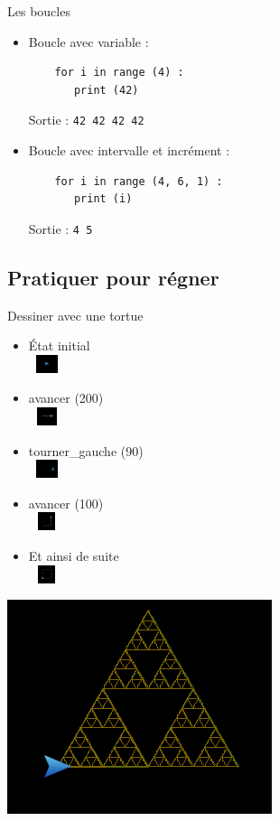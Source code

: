 \documentclass{beamer}
\begin{document}
\begin{frame}[fragile]{Les boucles}
\begin{itemize}
\item Boucle avec variable :
    \begin{lstlisting}
    for i in range (4) :
       print (42)
    \end{lstlisting}
    Sortie : \verb+42 42 42 42+
\item Boucle avec intervalle et incrément :
    \begin{lstlisting}
    for i in range (4, 6, 1) :
       print (i)
    \end{lstlisting}
    Sortie : \verb+4 5+
\end{itemize}
\end{frame}

\subsection{Pratiquer pour régner}
    \begin{frame}{Dessiner avec une tortue}
    \begin{itemize}
    \item État initial\\
    \includegraphics[width=40px,height=20px]{img/square_0}

    \item avancer (200)\\
    \includegraphics[width=40px,height=20px]{img/square_1}

    \item tourner\_gauche (90)\\
    \includegraphics[width=40px,height=20px]{img/square_2}

    \item avancer (100)\\
    \includegraphics[width=40px,height=20px]{img/square_3}

    \item Et ainsi de suite\\
    \includegraphics[width=40px,height=20px]{img/square_final}
    \end{itemize}
    \end{frame}
    \begin{frame}
    \includegraphics{img/sierpinski}
    \end{frame}
\end{document}
